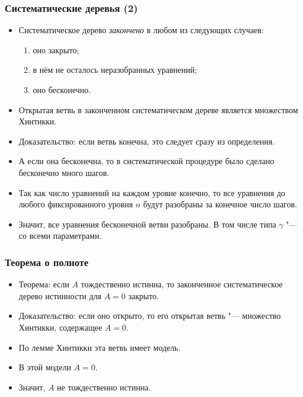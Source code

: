 \documentclass[10pt]{beamer}
\begin{document}
\begin{frame}
    \frametitle{Систематические деревья (2)}
    \begin{itemize}
        \item Систематическое дерево \emph{закончено} в любом из следующих случаев: 
        \begin{enumerate}
            \item оно закрыто;
            \item в нём не осталось неразобранных уравнений;
            \item оно бесконечно.
        \end{enumerate}
        \item Открытая ветвь в законченном систематическом дереве является множеством Хинтикки.
        \item Доказательство: если ветвь конечна, это следует сразу из определения. 
        \item А если она бесконечна, то в систематической процедуре было сделано бесконечно много шагов.
        \item Так как число уравнений на каждом уровне конечно, то все уравнения до любого фиксированного уровня $n$ будут разобраны за конечное число шагов.
        \item Значит, все уравнения бесконечной ветви разобраны. В том числе типа $\gamma$ "--- со всеми параметрами.
    \end{itemize}
\end{frame}

\begin{frame}
    \frametitle{Теорема о полноте}
    \begin{itemize}
        \item Теорема: если $A$ тождественно истинна, то законченное систематическое дерево истинности для $A=0$ закрыто.
        \pause
        \item Доказательство: если оно открыто, то его открытая ветвь "--- множество Хинтикки, содержащее $A=0$. 
        \item По лемме Хинтикки эта ветвь имеет модель.
        \item В этой модели $A=0$.
        \item Значит, $A$ не тождественно истинна.
    \end{itemize}
\end{frame}
\end{document}

